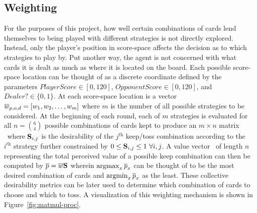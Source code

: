 

\subsection{Weighting}
\label{sec:dm-methods-weighting}



For the purposes of this project,
how well certain combinations of cards lend themselves to being played with 
different strategies is not directly explored.
%
Instead, only the player's position in score-space affects the decision as to
which strategies to play by.
%
Put another way, the agent is not concerned with  what cards it is dealt
as much as where it is located on the board.
%
Each possible score-space location can be thought of as a discrete coordinate
defined by the parameters
$\textit{PlayerScore} \in [0, 120]$,
$\textit{OpponentScore} \in [0, 120]$,
and
$\textit{Dealer?} \in \{0,1\}$.
%
At each score-space location is a vector $\overline{w}_{p,o,d} = [w_1,w_2,\ldots,w_m]$
where $m$ is the number of all possible strategies to be considered.
%
At the beginning of each round, each of $m$ strategies is evaluated for all
$n = {6 \choose 4}$ possible combinations of cards kept to produce an
$m \times n$ matrix \Smat\
where $\mathbf{S}_{i,j}$ is the desirability of the $j^{\textit{th}}$ keep/toss
combination according to the $i^{\textit{th}}$ strategy
further constrained by
$0 \le \mathbf{S}_{i,j} \le 1\ \forall i,j$.
%
A value vector \pvec\ of length $n$ representing the total perceived value of a
possible keep combination
can then be computed by
$\overline{p} = \overline{w} \mathbf{S}$
wherein $\operatorname*{argmax}_{x}{\overline{p}_x}$ can be thought of to be the most desired combination
of cards and $\operatorname*{argmin}_{x}{\overline{p}_x}$ as the least.
%
These collective desirability metrics can be later used to determine which
combination of cards to choose and which to toss.
%
A visualization of this weighting mechanism is shown in
Figure~\ref{fig:matmul-proc}.




